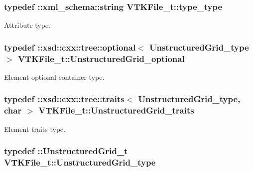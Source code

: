 \subsubsection[{type\+\_\+type}]{\setlength{\rightskip}{0pt plus 5cm}typedef \+::{\bf xml\+\_\+schema\+::string} {\bf V\+T\+K\+File\+\_\+t\+::type\+\_\+type}}\label{classVTKFile__t_ac1f3484e4fde414849ede43a00955f76}


Attribute type. 

\hypertarget{classVTKFile__t_ada5bb5a706e03ef1ab2ed1513ea83833}{}
\subsubsection[{Unstructured\+Grid\+\_\+optional}]{\setlength{\rightskip}{0pt plus 5cm}typedef \+::xsd\+::cxx\+::tree\+::optional$<$ {\bf Unstructured\+Grid\+\_\+type} $>$ {\bf V\+T\+K\+File\+\_\+t\+::\+Unstructured\+Grid\+\_\+optional}}\label{classVTKFile__t_ada5bb5a706e03ef1ab2ed1513ea83833}


Element optional container type. 

\hypertarget{classVTKFile__t_a02772a5f713678f02e94188d6a552528}{}
\subsubsection[{Unstructured\+Grid\+\_\+traits}]{\setlength{\rightskip}{0pt plus 5cm}typedef \+::xsd\+::cxx\+::tree\+::traits$<$ {\bf Unstructured\+Grid\+\_\+type}, char $>$ {\bf V\+T\+K\+File\+\_\+t\+::\+Unstructured\+Grid\+\_\+traits}}\label{classVTKFile__t_a02772a5f713678f02e94188d6a552528}


Element traits type. 

\hypertarget{classVTKFile__t_a34ea02f6804e701657f11a8dc3851951}{}
\subsubsection[{Unstructured\+Grid\+\_\+type}]{\setlength{\rightskip}{0pt plus 5cm}typedef \+::{\bf Unstructured\+Grid\+\_\+t} {\bf V\+T\+K\+File\+\_\+t\+::\+Unstructured\+Grid\+\_\+type}}\label{classVTKFile__t_a34ea02f6804e701657f11a8dc3851951}



